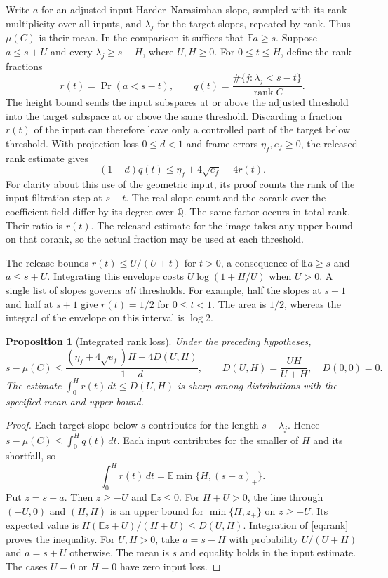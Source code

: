 \documentclass[11pt,letterpaper]{article}
\newcommand{\E}{\mathbb E}
\newcommand{\src}[2]{\href{https://github.com/leanprover-community/riemann-hypothesis/blob/main/src/#1.lean}{#2}}
\newtheorem{proposition}[theorem]{Proposition}
\numberwithin{equation}{section}
\begin{document}
Write \(a\) for an adjusted input Harder--Narasimhan slope, sampled with its rank multiplicity over all inputs, and \(\lambda_j\) for the target slopes, repeated by rank. Thus \(\mu(C)\) is their mean. In the comparison it suffices that \(\E a\ge s\). Suppose \(a\le s+U\) and every \(\lambda_j\ge s-H\), where \(U,H\ge0\). For \(0\le t\le H\), define the rank fractions
\[
       r(t)=\Pr(a<s-t),\qquad q(t)=\frac{\#\{j:\lambda_j<s-t\}}{\operatorname{rank}C}.
\]
The height bound sends the input subspaces at or above the adjusted threshold into the target subspace at or above the same threshold. Discarding a fraction \(r(t)\) of the input can therefore leave only a controlled part of the target below threshold. With projection loss \(0\le d<1\) and frame errors \(\eta_f,e_f\ge0\), the released
\src{Formalism/HarderNarasimhan/HarderNarasimhanProofs/TheoremFSharp}{rank estimate}
gives
\begin{equation}\label{eq:rank}
       (1-d)q(t)\le \eta_f+4\sqrt{e_f}+4r(t).
\end{equation}
For clarity about this use of the geometric input, its proof counts the rank of the input filtration step at \(s-t\). The real slope count and the corank over the coefficient field differ by its degree over \(\mathbb Q\). The same factor occurs in total rank. Their ratio is \(r(t)\). The released estimate for the image takes any upper bound on that corank, so the actual fraction may be used at each threshold.

The release bounds \(r(t)\le U/(U+t)\) for \(t>0\), a consequence of \(\E a\ge s\) and \(a\le s+U\). Integrating this envelope costs \(U\log(1+H/U)\) when \(U>0\). A single list of slopes governs \emph{all} thresholds. For example, half the slopes at \(s-1\) and half at \(s+1\) give \(r(t)=1/2\) for \(0\le t<1\). The area is \(1/2\), whereas the integral of the envelope on this interval is \(\log 2\).

\begin{proposition}[Integrated rank loss]\label{prop:slope}
Under the preceding hypotheses,
\[
 s-\mu(C)\le
 \frac{(\eta_f+4\sqrt{e_f})H+4D(U,H)}{1-d},
 \qquad D(U,H)=\frac{UH}{U+H},\quad D(0,0)=0 .
\]
The estimate \(\int_0^H r(t)\,dt\le D(U,H)\) is sharp among distributions with the specified mean and upper bound.
\end{proposition}
\begin{proof}
Each target slope below \(s\) contributes for the length \(s-\lambda_j\). Hence \(s-\mu(C)\le \int_0^H q(t)\,dt\). Each input contributes for the smaller of \(H\) and its shortfall, so
\[
                 \int_0^H r(t)\,dt=\E\min\{H,(s-a)_+\}.
\]
Put \(z=s-a\). Then \(z\ge-U\) and \(\E z\le0\). For \(H+U>0\), the line through \((-U,0)\) and \((H,H)\) is an upper bound for \(\min\{H,z_+\}\) on \(z\ge-U\). Its expected value is \(H(\E z+U)/(H+U)\le D(U,H)\). Integration of \eqref{eq:rank} proves the inequality. For \(U,H>0\), take \(a=s-H\) with probability \(U/(U+H)\) and \(a=s+U\) otherwise. The mean is \(s\) and equality holds in the input estimate. The cases \(U=0\) or \(H=0\) have zero input loss.
\end{proof}
\end{document}
